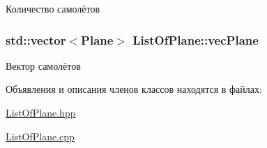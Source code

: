 Количество самолётов 

\subsubsection[{\texorpdfstring{vec\+Plane}{vecPlane}}]{\setlength{\rightskip}{0pt plus 5cm}std\+::vector$<${\bf Plane}$>$ List\+Of\+Plane\+::vec\+Plane\hspace{0.3cm}{\ttfamily [private]}}\hypertarget{class_list_of_plane_a83564d3342c3c10cc601f8512169f15c}{}\label{class_list_of_plane_a83564d3342c3c10cc601f8512169f15c}


Вектор самолётов 



Объявления и описания членов классов находятся в файлах\+:\begin{DoxyCompactItemize}
\item 
\hyperlink{_list_of_plane_8hpp}{List\+Of\+Plane.\+hpp}\item 
\hyperlink{_list_of_plane_8cpp}{List\+Of\+Plane.\+cpp}\end{DoxyCompactItemize}
